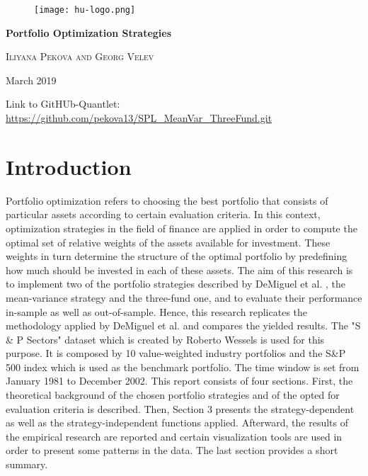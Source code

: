 \documentclass{article}
\begin{document}
\begin{titlepage}


\begin{figure}[H]
  \begin{minipage}[t]{.49\textwidth}
    \texttt{[image: hu-logo.png]}  
  \end{minipage}
  \label{fig:spektren01sd}
\end{figure}

\vspace{10mm}


\begin{center}
		\vspace{2cm}
		{\huge\bfseries Portfolio Optimization Strategies \par}
		\vspace{2cm}
		{\scshape\LARGE Iliyana Pekova and Georg Velev\par}
		\vspace{2cm}
		{\huge\large March 2019 \par}
		
\end{center}
\end{titlepage}

\tableofcontents
\vspace{3cm}
\medskip
Link to GitHUb-Quantlet: \url{https://github.com/pekova13/SPL_MeanVar_ThreeFund.git}
\section{Introduction}
Portfolio optimization refers to choosing the best portfolio that consists of particular assets according to certain evaluation criteria. In this context, optimization strategies in the field of finance are applied in order to compute the optimal set of relative weights of the assets available for investment. These weights in turn determine the structure of the optimal portfolio by predefining how much should be invested in each of these assets.\endgraf
The aim of this research is to implement two of the portfolio strategies described by DeMiguel et al. \cite{DEM09}, the mean-variance strategy and the three-fund one, and to evaluate their performance in-sample as well as out-of-sample. Hence, this research replicates the methodology applied by DeMiguel et al. \cite{DEM09} and compares the yielded results. The "S \& P Sectors" dataset which is created by Roberto Wessels is used for this purpose. It is composed by 10 value-weighted industry portfolios and the S\&P 500 index which is used as the benchmark portfolio. The time window is set from January 1981 to December 2002.\endgraf
This report consists of four sections. First, the theoretical background of the chosen portfolio strategies and of the opted for evaluation criteria is described. Then, Section 3 presents the strategy-dependent as well as the strategy-independent functions applied. Afterward, the results of the empirical research are reported and certain visualization tools are used in order to present some patterns in the data. The last section provides a short summary.
\end{document}
